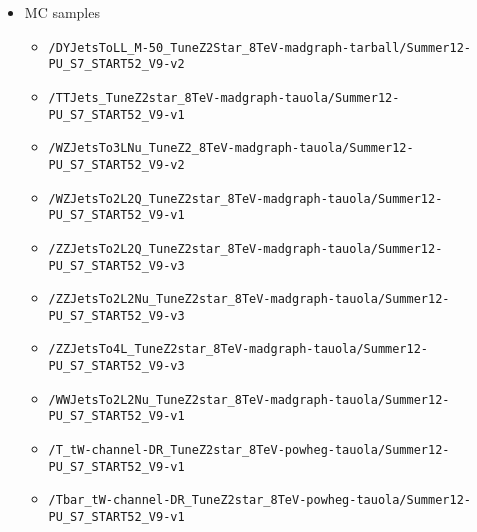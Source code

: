 \begin{itemize}
\item MC samples
  \begin{itemize} 
  \item {\footnotesize \verb=/DYJetsToLL_M-50_TuneZ2Star_8TeV-madgraph-tarball/Summer12-PU_S7_START52_V9-v2=}
  \item {\footnotesize \verb=/TTJets_TuneZ2star_8TeV-madgraph-tauola/Summer12-PU_S7_START52_V9-v1=}
  \item {\footnotesize \verb=/WZJetsTo3LNu_TuneZ2_8TeV-madgraph-tauola/Summer12-PU_S7_START52_V9-v2=}
  \item {\footnotesize \verb=/WZJetsTo2L2Q_TuneZ2star_8TeV-madgraph-tauola/Summer12-PU_S7_START52_V9-v1=}
  \item {\footnotesize \verb=/ZZJetsTo2L2Q_TuneZ2star_8TeV-madgraph-tauola/Summer12-PU_S7_START52_V9-v3=}
  \item {\footnotesize \verb=/ZZJetsTo2L2Nu_TuneZ2star_8TeV-madgraph-tauola/Summer12-PU_S7_START52_V9-v3=}
  \item {\footnotesize \verb=/ZZJetsTo4L_TuneZ2star_8TeV-madgraph-tauola/Summer12-PU_S7_START52_V9-v3=}
  \item {\footnotesize \verb=/WWJetsTo2L2Nu_TuneZ2star_8TeV-madgraph-tauola/Summer12-PU_S7_START52_V9-v1=}
  \item {\footnotesize \verb=/T_tW-channel-DR_TuneZ2star_8TeV-powheg-tauola/Summer12-PU_S7_START52_V9-v1=}
  \item {\footnotesize \verb=/Tbar_tW-channel-DR_TuneZ2star_8TeV-powheg-tauola/Summer12-PU_S7_START52_V9-v1=}
 \end{itemize}
\end{itemize}


